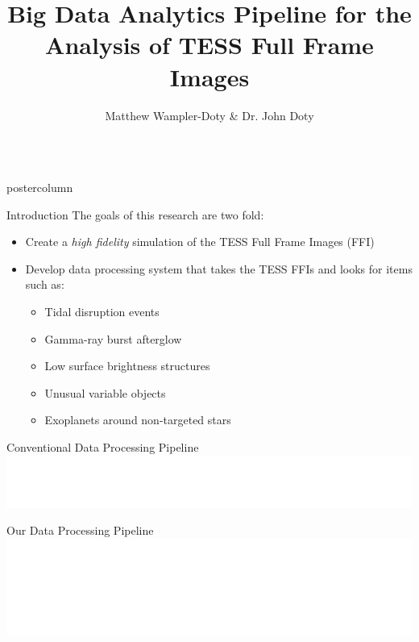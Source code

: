 \documentclass[final,hyperref={pdfpagelabels=false}]{beamer}
\title{\LARGE Big Data Analytics Pipeline for the Analysis of TESS Full Frame Images}
\author{Matthew Wampler-Doty \& Dr. John Doty}
\institute[Noqsi Aerospace]{Noqsi Aerospace, Ltd. \& MIT}
\date[]{}
\newlength{\columnheight}
\begin{document}
\begin{frame}
  \begin{columns}
    \begin{column}{.49\textwidth}
      \begin{beamercolorbox}[center,wd=\textwidth]{postercolumn}
        \begin{minipage}[T]{.95\textwidth}  %
          \parbox[t][\columnheight]{\textwidth}{
            \begin{block}{Introduction}
            The goals of this research are two fold:
              \begin{itemize}
              \item Create a \emph{high fidelity} simulation of the TESS Full Frame Images (FFI)
              \item Develop data processing system that takes the TESS FFIs and looks for items such as:
              \begin{itemize}
              	\item Tidal disruption events
	        \item Gamma-ray burst afterglow
		\item Low surface brightness structures
		\item Unusual variable objects
		\item Exoplanets around non-targeted stars
              \end{itemize}
              \end{itemize}              
            \end{block}

            \vspace{2cm}
            \begin{block}{Conventional Data Processing Pipeline}
              \includegraphics[width=0.95\linewidth]{figures/Conventional_Pipeline.pdf}
            \end{block}

            \vspace{2cm}
            \begin{block}{Our Data Processing Pipeline}
              \includegraphics[width=0.95\linewidth]{figures/Our_Pipeline.pdf}
            \end{block}

}
\end{minipage}
\end{beamercolorbox}
\end{column}
\end{columns}
\end{frame}
\end{document}

